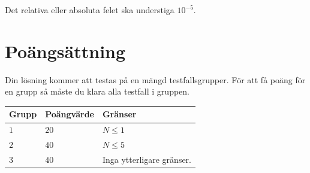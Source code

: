 Det relativa eller absoluta felet ska understiga $10^{-5}$.

\section*{Poängsättning}
Din lösning kommer att testas på en mängd testfallsgrupper.
För att få poäng för en grupp så måste du klara alla testfall i gruppen.

\noindent
\begin{tabular}{| l | l | p{12cm} |}
  \hline
  Grupp & Poängvärde & Gränser \\ \hline
  $1$    & $20$        & $N \le 1$ \\ \hline 
  $2$    & $40$        & $N \le 5$ \\ \hline
  $3$    & $40$        & Inga ytterligare gränser. \\ \hline 
\end{tabular}
